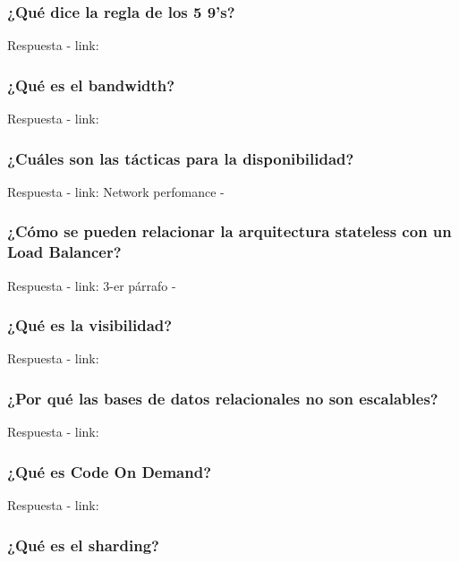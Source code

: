 \documentclass{article}
\begin{document}
    \subsubsection{¿Qué dice la regla de los 5 9's?}

    Respuesta - link: \textbf{~}


    \subsubsection{¿Qué es el bandwidth?}

    Respuesta - link: \textbf{~} 

    
    \subsubsection{¿Cuáles son las tácticas para la disponibilidad?}
    
    Respuesta - link: Network perfomance - \textbf{~}

    \subsubsection{¿Cómo se pueden relacionar la arquitectura \textbf{stateless} con un \textbf{Load Balancer}?}
    
    Respuesta - link: 3-er párrafo - \textbf{~}

    \subsubsection{¿Qué es la visibilidad?}
    Respuesta - link: \textbf{~}
    
    \subsubsection{¿Por qué las bases de datos relacionales no son escalables?}

    Respuesta - link: \textbf{~}

    \subsubsection{¿Qué es Code On Demand?}

    Respuesta - link: \textbf{~}


    \subsubsection{¿Qué es el sharding?}
\end{document}
